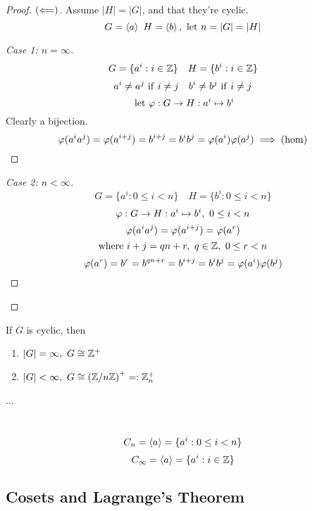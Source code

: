 \documentclass[12pt]{article}
\newcommand{\order}[1]{\left\lvert#1\right\rvert}
\begin{document}
\bboxproof
\begin{proof}
    \((\Longleftarrow)\). Assume \(|H|=|G|\), and that they're cyclic.
    \[
        G=\gen{a} \ H=\gen{b} ,\llet n=|G|=|H|
    \]
    \bboxproof
    \begin{proof}[Case 1: \(n=\infty\)]\ 
        \[
            G=\{a^i:i\in\mathbb Z\}\quad H=\{b^i:i\in\mathbb Z\}
        \]
        \[
            a^i\neq a^j\ \mathrm{if}\  i\neq j\quad b^i\neq b^j\ \mathrm{if}\  i\neq j
        \]
        \[
            \ \mathrm{let}\  \varphi : G \to H : a^i\mapsto b^i
        \]
        Clearly a bijection.
        \[
            \varphi(a^ia^j)=\varphi(a^{i+j})=b^{i+j}=b^ib^j=\varphi(a^i)\varphi(a^j)
            \implies(\mathrm{hom})
        \]
    \end{proof}
    \ebox
    \bboxproof
    \begin{proof}[Case 2: \(n<\infty\)]
        \[
            G = \{a^i : 0\le i<n\}\quad
            H = \{b^i : 0\le i<n\}
        \]
        \[
            \varphi:G\to H:a^i\mapsto b^i,\ 0\le i<n
        \]
        \[
            \varphi(a^ia^j)=\varphi(a^{i+j})=\varphi(a^r)
        \]
        \[
            \mathrm{where}\ i+j=qn+r,\ q\in\mathbb Z,\ 0\le r<n
        \]
        \[
            \varphi(a^r)=b^r=b^{qn+r}=b^{i+j}=b^ib^j=
            \varphi(a^i)\varphi(b^j)
        \]
    \end{proof}
    \ebox
\end{proof}
\ebox

\bboxcoro
\begin{coro}
    If \(G\) is cyclic, then
    \begin{enumerate}
        \item \(\order{G}=\infty,\ G\isom\Z^+\)
        \item \(\order{G}<\infty,\ G\isom\left(\Z/n\Z\right)^+=:\Z^+_n\)
    \end{enumerate}
\end{coro}
\ebox

\bboxcoro
\begin{coro}
    ...
\end{coro}
\ebox


\bboxnota
\begin{nota}\
    \[
        C_n=\left\langle a\right\rangle=\{a^i : 0\le i< n\}
    \]
    \[
        C_\infty = \left\langle a\right\rangle = \{ a^i : i \in \mathbb Z \}
    \]
\end{nota}
\ebox

\subsection{Cosets and Lagrange's Theorem}
\end{document}
